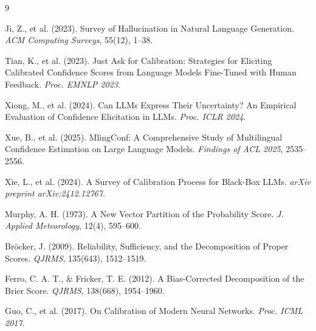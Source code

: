 \documentclass[10pt,a4paper,twocolumn]{article}
\begin{document}
\begin{thebibliography}{9}

Ji, Z., et al. (2023).
Survey of Hallucination in Natural Language Generation.
\textit{ACM Computing Surveys}, 55(12), 1--38.

Tian, K., et al. (2023).
Just Ask for Calibration: Strategies for Eliciting Calibrated Confidence Scores
from Language Models Fine-Tuned with Human Feedback.
\textit{Proc. EMNLP 2023}.

Xiong, M., et al. (2024).
Can LLMs Express Their Uncertainty? An Empirical Evaluation of Confidence
Elicitation in LLMs.
\textit{Proc. ICLR 2024}.

Xue, B., et al. (2025).
MlingConf: A Comprehensive Study of Multilingual Confidence Estimation on
Large Language Models.
\textit{Findings of ACL 2025}, 2535--2556.

Xie, L., et al. (2024).
A Survey of Calibration Process for Black-Box LLMs.
\textit{arXiv preprint arXiv:2412.12767}.

Murphy, A. H. (1973).
A New Vector Partition of the Probability Score.
\textit{J. Applied Meteorology}, 12(4), 595--600.

Bröcker, J. (2009).
Reliability, Sufficiency, and the Decomposition of Proper Scores.
\textit{QJRMS}, 135(643), 1512--1519.

Ferro, C. A. T., \& Fricker, T. E. (2012).
A Bias-Corrected Decomposition of the Brier Score.
\textit{QJRMS}, 138(668), 1954--1960.

Guo, C., et al. (2017).
On Calibration of Modern Neural Networks.
\textit{Proc. ICML 2017}.

\end{thebibliography}
\end{document}
